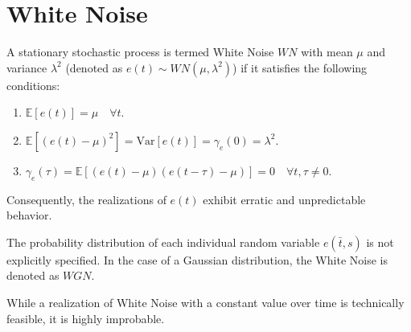 \section{White Noise}

\begin{definition}
    A stationary stochastic process is termed White Noise $WN$ with mean $\mu$ and variance $\lambda^2$ (denoted as $e(t)\sim WN(\mu,\lambda^2)$) if it satisfies the following conditions:
\end{definition}
\begin{enumerate}
    \item $\mathbb{E}\left[e(t)\right]=\mu \quad \forall t$. 
    \item $\mathbb{E}\left[\left(e(t)-\mu\right)^2\right]=\text{Var}\left[e(t)\right]=\gamma_e(0)=\lambda^2$. 
    \item $\gamma_e(\tau)=\mathbb{E}\left[ \left(e(t)-\mu\right)\left(e(t-\tau)-\mu\right) \right]=0 \quad \forall t,\tau \neq 0$. 
\end{enumerate}
Consequently, the realizations of $e(t)$ exhibit erratic and unpredictable behavior.

The probability distribution of each individual random variable $e(\bar{t},s)$ is not explicitly specified.
In the case of a Gaussian distribution, the White Noise is denoted as $WGN$.

While a realization of White Noise with a constant value over time is technically feasible, it is highly improbable.